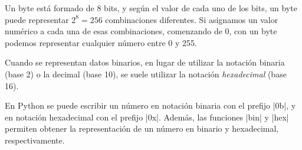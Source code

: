 \begin{sabias_que}
\edef\myindent{\the\parindent}%
\noindent%
\begin{minipage}{.55\textwidth}
Un byte está formado de 8 bits, y según el valor de cada uno de los bits, un byte
puede representar $2^8 = 256$ combinaciones diferentes.
Si asignamos un valor numérico a cada una de esas combinaciones, comenzando
de 0, con un byte podemos representar cualquier número entre 0 y 255.

\setlength{\parindent}{\myindent}
Cuando se representan datos binarios, en lugar de utilizar la notación
binaria (base 2) o la decimal (base 10), se suele utilizar la notación
\emph{hexadecimal} (base 16).

En Python se puede escribir un número en notación binaria con el prefijo |0b|,
y en notación hexadecimal con el prefijo |0x|. Además, las funciones |bin|
y |hex| permiten obtener la representación de un número en binario y
hexadecimal, respectivamente.


\end{minipage}
\end{sabias_que}
